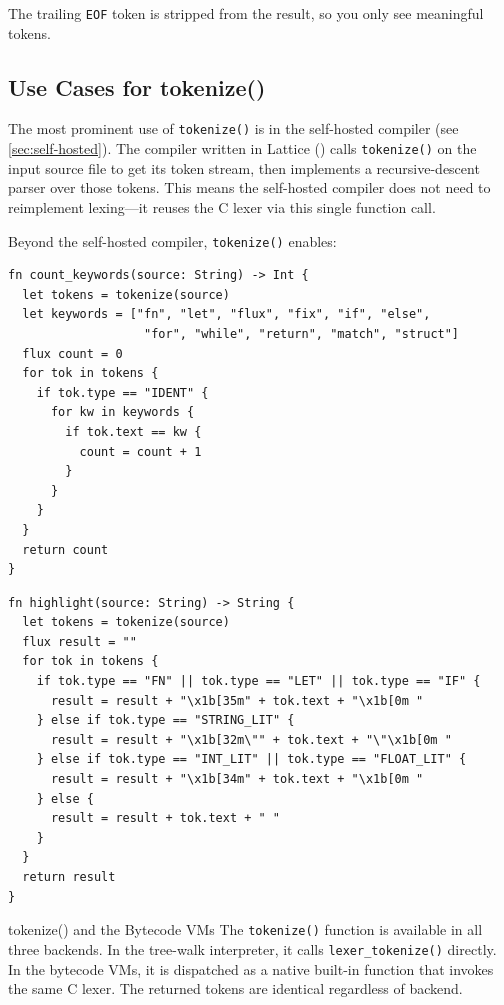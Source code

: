 The trailing \lstinline|EOF| token is stripped from the result, so you only see meaningful tokens.

\subsection{Use Cases for tokenize()}

The most prominent use of \lstinline|tokenize()| is in the self-hosted compiler (see \cref{sec:self-hosted}).
The compiler written in Lattice () calls \lstinline|tokenize()| on the input source file to get its token stream, then implements a recursive-descent parser over those tokens.
This means the self-hosted compiler does not need to reimplement lexing---it reuses the C lexer via this single function call.

Beyond the self-hosted compiler, \lstinline|tokenize()| enables:

\begin{lstlisting}[language=Lattice, caption={Counting keywords in a source file}]
fn count_keywords(source: String) -> Int {
  let tokens = tokenize(source)
  let keywords = ["fn", "let", "flux", "fix", "if", "else",
                   "for", "while", "return", "match", "struct"]
  flux count = 0
  for tok in tokens {
    if tok.type == "IDENT" {
      for kw in keywords {
        if tok.text == kw {
          count = count + 1
        }
      }
    }
  }
  return count
}
\end{lstlisting}

\begin{lstlisting}[language=Lattice, caption={A syntax highlighter skeleton}]
fn highlight(source: String) -> String {
  let tokens = tokenize(source)
  flux result = ""
  for tok in tokens {
    if tok.type == "FN" || tok.type == "LET" || tok.type == "IF" {
      result = result + "\x1b[35m" + tok.text + "\x1b[0m "
    } else if tok.type == "STRING_LIT" {
      result = result + "\x1b[32m\"" + tok.text + "\"\x1b[0m "
    } else if tok.type == "INT_LIT" || tok.type == "FLOAT_LIT" {
      result = result + "\x1b[34m" + tok.text + "\x1b[0m "
    } else {
      result = result + tok.text + " "
    }
  }
  return result
}
\end{lstlisting}

\begin{notebox}{tokenize() and the Bytecode VMs}
The \lstinline|tokenize()| function is available in all three backends.
In the tree-walk interpreter, it calls \lstinline|lexer_tokenize()| directly.
In the bytecode VMs, it is dispatched as a native built-in function that invokes the same C lexer.
The returned tokens are identical regardless of backend.
\end{notebox}

